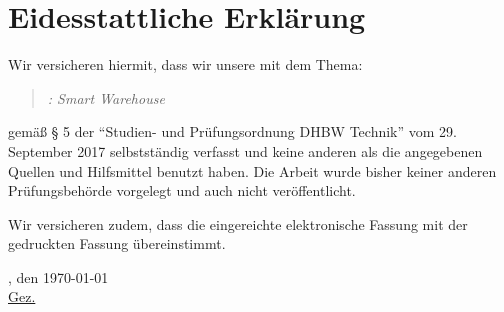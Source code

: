 \chapter*{Eidesstattliche Erklärung}
Wir versicheren hiermit, dass wir unsere \arbeit{} mit dem Thema:
\begin{quote}
	\textit{\titel: Smart Warehouse}
\end{quote} 
gemäß § 5 der \enquote{Studien- und Prüfungsordnung DHBW Technik} vom 29. September 2017 selbstständig verfasst und keine anderen als die angegebenen Quellen und Hilfsmittel benutzt haben. Die Arbeit wurde bisher keiner anderen Prüfungsbehörde vorgelegt und auch nicht veröffentlicht.

\vspace{0.25cm}

Wir versicheren zudem, dass die eingereichte elektronische Fassung mit der gedruckten Fassung übereinstimmt.

\vspace{1cm}

\verfassungsort, den \today \\[0.5cm]
	{\underline{Gez. \autor}}
	{\makebox[6cm]{\hrulefill}}\\ 
\autorReverse
